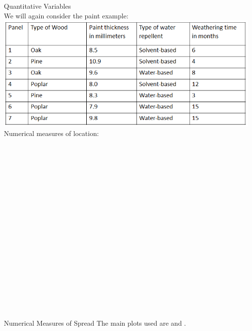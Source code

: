 \newpage
\huge Quantitative Variables \normalsize\\
We will again consider the paint example:\\
\includegraphics[scale=0.5]{paintexample}\\
Numerical measures of location:\\~\\~\\~\\~\\~\\~\\~\\~\\~\\~\\~\\~\\~\\~\\~\\~\\~\\~\\~\\
\newpage
Numerical Measures of Spread
\newpage
The main plots used are \underbar{~~~~~~~~~~~~~~~~~~~~~~~~~~~~~~~~~~~~} and  \underbar{~~~~~~~~~~~~~~~~~~~~~~~~~~~~~~~~~~~~}.\\~\\

